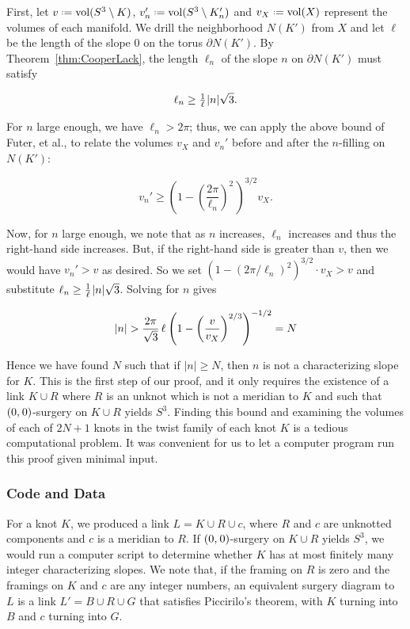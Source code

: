 \documentclass[11pt,usenames,dvipsnames,reqno]{amsart}
\newcommand{\vol}{\operatorname{vol}}
\newcommand{\defeq}{\mathrel{\vcenter{\baselineskip0.5ex\lineskiplimit0pt\hbox{\scriptsize.}\hbox{\scriptsize.}}}=}
\newcommand{\hs}{\hspace{0.05em}} %
\numberwithin{theorem}{section}
\theoremstyle{ex}
\theoremstyle{rem}
\begin{document}
First, let $v\defeq\vol(S^3\setminus K)$, $v_n'\defeq\vol(S^3\setminus K_n')$ and $v_X\defeq\vol(X)$ represent the volumes of each manifold. We drill the neighborhood $N(K')$ from $X$ and let $\ell$ be the length of the slope $0$ on the torus $\partial N(K')$. By Theorem~\ref{thm:CooperLack}, the length ${\ell}_n$ of the slope $n$ on $\partial N(K')$ must satisfy

$${\ell}_n\ge\tfrac{1}{\ell}\hs|n|\sqrt{3}.$$

For $n$ large enough, we have ${\ell}_n>2\pi$; thus, we can apply the above bound of Futer, et al., to relate the volumes $v_X$ and $v_n'$ before and after the $n$-filling on $N(K')$:

$$v_n'\ge\left(1-\left(\frac{2\pi}{{\ell}_n}\right)^2\,\right)^{3/2} v_X.$$

Now, for $n$ large enough, we note that as $n$ increases, ${\ell}_n$ increases and thus the right-hand side increases. But, if the right-hand side is greater than $v$, then we would have $v_n'>v$ as desired. So we set $(1-(2\pi/{\ell}_n)^2)^{3/2}\cdot v_X>v$ and substitute ${\ell}_n\ge\frac{1}{\ell}\hs|n|\sqrt{3}$. Solving for $n$ gives

\begin{equation}
|n|>\frac{2\pi}{\sqrt{3}}\,\ell\hs\left(1-\left(\frac{v}{v_X}\right)^{2/3}\right)^{-1/2} = N
\end{equation}

Hence we have found $N$ such that if $|n|\ge N$, then $n$ is not a characterizing slope for $K$. This is the first step of our proof, and it only requires the existence of a link $K \cup R$ where $R$ is an unknot which is not a meridian to $K$ and such that $(0,\hs0)$-surgery on $K\cup R$ yields $S^3$. Finding this bound and examining the volumes of each of $2 N + 1$ knots in the twist family of each knot $K$ is a tedious computational problem. It was convenient for us to let a computer program run this proof given minimal input.

\subsubsection{Code and Data}\label{sec:code}
For a knot $K$, we produced a link $L = K \cup R \cup c$, where $R$ and $c$ are unknotted components and $c$ is a meridian to $R$. If $(0,\hs0)$-surgery on $K\cup R$ yields $S^3$, we would run a computer script to determine whether $K$ has at most finitely many integer characterizing slopes. We note that, if the framing on $R$ is zero and the framings on $K$ and $c$ are any integer numbers, an equivalent surgery diagram to $L$ is a link $L' = B \cup R \cup G$ that satisfies Piccirilo's theorem, with $K$ turning into $B$ and $c$ turning into $G$.
\end{document}
